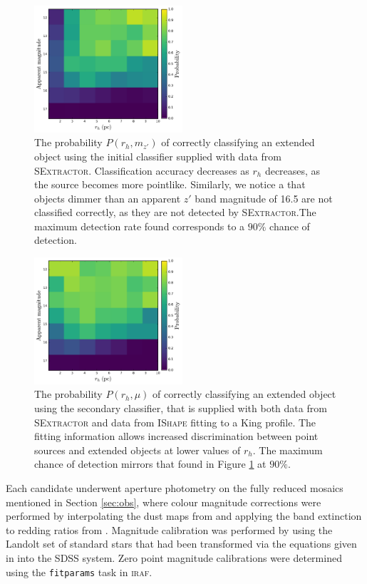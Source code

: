 \documentclass[useAMS,usenatbib]{mn2e}
\begin{document}
\begin{figure}
	\includegraphics[width=0.49\textwidth]{images/classifier_1.pdf}
	\caption{The probability $P(r_h, m_{z'})$ of correctly classifying an extended object using the initial classifier supplied with data from \textsc{SExtractor}. Classification accuracy decreases as $r_h$ decreases, as the source becomes more pointlike. Similarly, we notice a that objects dimmer than an apparent $z'$ band magnitude of 16.5 are not classified correctly, as they are not detected by \textsc{SExtractor}.The maximum detection rate found corresponds to a $90\%$ chance of detection.}
	\label{fig:comp1}
\end{figure}
\begin{figure}
	\includegraphics[width=0.49\textwidth]{images/classifier_2.pdf}
	\caption{The probability $P(r_h, \mu)$ of correctly classifying an extended object using the secondary classifier, that is supplied with both data from \textsc{SExtractor} and data from \textsc{IShape} fitting to a King profile. The fitting information allows increased discrimination between point sources and extended objects at lower values of $r_h$. The maximum chance of detection mirrors that found in Figure \ref{fig:comp1} at $90\%$.}
	\label{fig:comp2}
\end{figure}



Each candidate underwent aperture photometry on the fully reduced mosaics mentioned in Section \ref{sec:obs}, where colour magnitude corrections were performed by interpolating the dust maps from \citet{Schlegel1998} and applying the band extinction to redding ratios from \citet{Schlafly2011}. Magnitude calibration was performed by using the Landolt set of standard stars \citep{Landolt1992} that had been transformed via the equations given in \citet{Fukugita1996} into the SDSS system. Zero point magnitude calibrations were determined using the \verb|fitparams| task in \textsc{iraf}.
\end{document}
